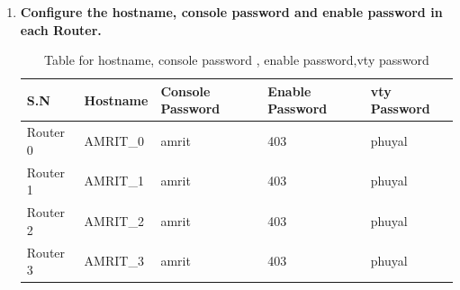 \documentclass[a4paper,11pt]{article}
\begin{document}
\begin{enumerate}
    \item\textbf{Configure the hostname, console password and enable password in each Router.}



          \begin{table}[H]
              \centering
              \begin{tabular} {| m{6em}| m{6em}| m{9em} | m{8em}| m{7em} |}
                  \hline
                  {\cellcolor[rgb]{0.278,0.671,0.984}}\textbf{S.N} & \textbf{Hostname} & \textbf{Console Password} & \textbf{Enable Password} & \textbf{vty Password} \\
                  \hline
                  {\cellcolor[rgb]{0.278,0.671,0.984}}Router 0     & AMRIT\_0          & amrit                     & 403                      & phuyal                \\
                  \hline
                  {\cellcolor[rgb]{0.278,0.671,0.984}}Router 1     & AMRIT\_1          & amrit                     & 403                      & phuyal                \\
                  \hline
                  {\cellcolor[rgb]{0.278,0.671,0.984}}Router 2     & AMRIT\_2          & amrit                     & 403                      & phuyal                \\
                  \hline
                  {\cellcolor[rgb]{0.278,0.671,0.984}}Router 3     & AMRIT\_3          & amrit                     & 403                      & phuyal                \\
                  \hline
              \end{tabular}
              \caption{Table for hostname, console password , enable password,vty password}
          \end{table}



\end{enumerate}
\end{document}
